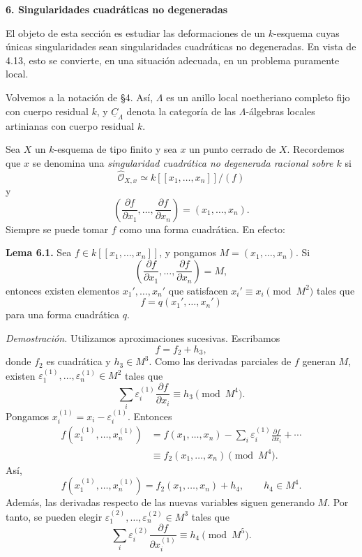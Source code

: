 \par\bigskip
\noindent\textbf{6. Singularidades cuadráticas no degeneradas}

\medskip
El objeto de esta sección es estudiar las deformaciones de un
$k$-esquema cuyas únicas singularidades sean singularidades
cuadráticas no degeneradas. En vista de 4.13, esto se convierte, en
una situación adecuada, en un problema puramente local.

Volvemos a la notación de \S4. Así, $\Lambda$ es un anillo local
noetheriano completo fijo con cuerpo residual $k$, y
$\underline C_\Lambda$ denota la categoría de las $\Lambda$-álgebras
locales artinianas con cuerpo residual $k$.

Sea $X$ un $k$-esquema de tipo finito y sea $x$ un punto cerrado de
$X$. Recordemos que $x$ se denomina una \emph{singularidad cuadrática
no degenerada racional sobre $k$} si
\[
\widehat{\mathcal O}_{X,x}
 \simeq k[[x_1,\ldots,x_n]]/(f)
\]
y
\[
\left(\frac{\partial f}{\partial x_1},\ldots,
      \frac{\partial f}{\partial x_n}\right)
=(x_1,\ldots,x_n).
\]
Siempre se puede tomar $f$ como una forma cuadrática. En efecto:

\medskip
\noindent\textbf{Lema 6.1.}
Sea $f\in k[[x_1,\ldots,x_n]]$, y pongamos
$M=(x_1,\ldots,x_n)$. Si
\[
\left(\frac{\partial f}{\partial x_1},\ldots,
      \frac{\partial f}{\partial x_n}\right)=M,
\]
entonces existen elementos $x_1',\ldots,x_n'$ que satisfacen
$x_i'\equiv x_i\pmod{M^2}$ tales que
\[
f=q(x_1',\ldots,x_n')
\]
para una forma cuadrática $q$.

\smallskip
\noindent\textit{Demostración.}
Utilizamos aproximaciones sucesivas. Escribamos
\[
f=f_2+h_3,
\]
donde $f_2$ es cuadrática y $h_3\in M^3$. Como las derivadas parciales
de $f$ generan $M$, existen
$\varepsilon_1^{(1)},\ldots,\varepsilon_n^{(1)}\in M^2$ tales que
\[
\sum_i\varepsilon_i^{(1)}\frac{\partial f}{\partial x_i}
 \equiv h_3\pmod{M^4}.
\]
Pongamos $x_i^{(1)}=x_i-\varepsilon_i^{(1)}$. Entonces
\[
\begin{aligned}
f(x_1^{(1)},\ldots,x_n^{(1)})
&=f(x_1,\ldots,x_n)
 -\sum_i\varepsilon_i^{(1)}\frac{\partial f}{\partial x_i}
 +\cdots\\
&\equiv f_2(x_1,\ldots,x_n)\pmod{M^4}.
\end{aligned}
\]
Así,
\[
f(x_1^{(1)},\ldots,x_n^{(1)})
=f_2(x_1,\ldots,x_n)+h_4,
\qquad h_4\in M^4.
\]
Además, las derivadas respecto de las nuevas variables siguen
generando $M$. Por tanto, se pueden elegir
$\varepsilon_1^{(2)},\ldots,\varepsilon_n^{(2)}\in M^3$ tales que
\[
\sum_i\varepsilon_i^{(2)}
 \frac{\partial f}{\partial x_i^{(1)}}
 \equiv h_4\pmod{M^5}.
\]

